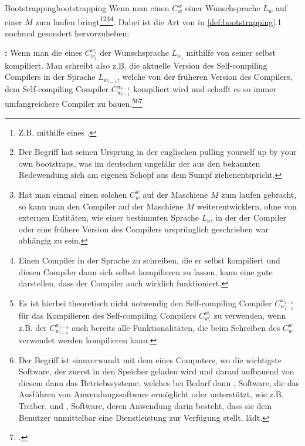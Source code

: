 \begin{Definition}{Bootstrapping}{bootstrapping}
  Wenn man einen  $C_{w}^{w}$ einer Wunschsprache $L_w$ auf einer  $M$ zum laufen bringt\footnote{Z.B. mithilfe eines .}\footnote{Der Begriff hat seinen Ursprung in der englischen  \glqq pulling yourself up by your own bootstraps\grqq, was im deutschen ungefähr der aus den  bekannten Redewendung \glqq sich am eigenen Schopf aus dem Sumpf ziehen\grqq entspricht.}\footnote{Hat man einmal einen solchen  $C_{w}^{w}$ auf der Maschiene $M$ zum laufen gebracht, so kann man den Compiler auf der Maschiene $M$ weiterentwicklern, ohne von externen Entitäten, wie einer bestimmten Sprache $L_o$, in der der Compiler oder eine frühere Version des Compilers ursprünglich geschrieben war abhängig zu sein.}\footnote{Einen Compiler in der Sprache zu schreiben, die er selbst kompiliert und diesen Compiler dann sich selbst kompilieren zu lassen, kann eine gute  darstellen, dass der Compiler auch wirklich funktioniert.}. Dabei ist die Art von  in \ref{def:bootstrapping}{.1} nochmal gesondert hervorzuheben:

  {\normalfont\bfseries {}:\:\ignorespaces}
  Wenn man die  eines  $C_{w_i}^{w_i}$ der Wunschsprache $L_{w_i}$ mithilfe von  seiner selbst kompiliert. Man schreibt also z.B. die aktuelle Version des Self-compiling Compilers in der Sprache $L_{w_{i-1}}$, welche von der früheren Version des Compilers, dem Self-compiling Compiler $C_{w_{i-1}}^{w_{i-1}}$ kompiliert wird und schafft es so  immer umfangreichere Compiler zu bauen.\footnote{Es ist hierbei theoretisch nicht notwendig den  Self-compiling Compiler $C_{w_{i-1}}^{w_{i-1}}$ für das Kompilieren des  Self-compiling Compilers $C_{w_i}^{w_i}$ zu verwenden, wenn z.B. der  $C_{w_{i-3}}^{w_{i-3}}$ auch bereits alle Funktionalitäten, die beim Schreiben des  $C_w^w$ verwendet werden kompilieren kann.}\footnote{Der Begriff ist sinnverwandt mit dem  eines Computers, wo die wichtigste Software, der  zuerst in den Speicher geladen wird und darauf aufbauend von diesem dann das Betriebssysteme, welches bei Bedarf dann , Software, die das Ausführen von Anwendungssoftware ermöglicht oder unterstützt, wie z.B. Treiber. und , Software, deren Anwendung darin besteht, dass sie dem Benutzer unmittelbar eine Dienstleistung zur Verfügung stellt, lädt.}\footcite{earley_formalism_1970}
\end{Definition}

